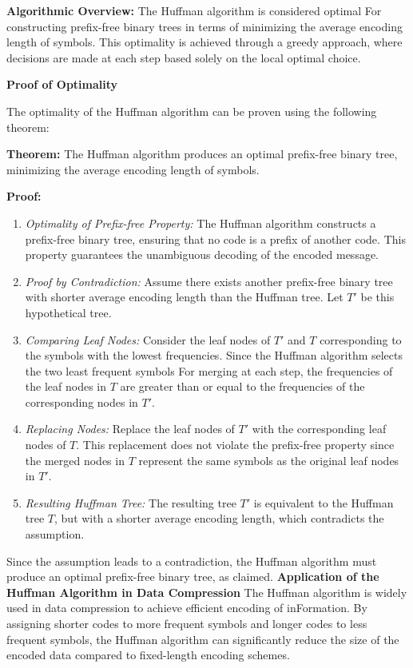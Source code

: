 \documentclass[12pt]{book} %
\begin{document}
\textbf{Algorithmic Overview:}
\FloatBarrier
The Huffman algorithm is considered optimal For constructing prefix-free binary trees in terms of minimizing the average encoding length of symbols. This optimality is achieved through a greedy approach, where decisions are made at each step based solely on the local optimal choice.

\textbf{Proof of Optimality}

The optimality of the Huffman algorithm can be proven using the following theorem:

\textbf{Theorem:} The Huffman algorithm produces an optimal prefix-free binary tree, minimizing the average encoding length of symbols.

\textbf{Proof:} 

\begin{enumerate}
    \item \textit{Optimality of Prefix-free Property:} The Huffman algorithm constructs a prefix-free binary tree, ensuring that no code is a prefix of another code. This property guarantees the unambiguous decoding of the encoded message.
    
    \item \textit{Proof by Contradiction:} Assume there exists another prefix-free binary tree with shorter average encoding length than the Huffman tree. Let $T'$ be this hypothetical tree.
    
    \item \textit{Comparing Leaf Nodes:} Consider the leaf nodes of $T'$ and $T$ corresponding to the symbols with the lowest frequencies. Since the Huffman algorithm selects the two least frequent symbols For merging at each step, the frequencies of the leaf nodes in $T$ are greater than or equal to the frequencies of the corresponding nodes in $T'$.
    
    \item \textit{Replacing Nodes:} Replace the leaf nodes of $T'$ with the corresponding leaf nodes of $T$. This replacement does not violate the prefix-free property since the merged nodes in $T$ represent the same symbols as the original leaf nodes in $T'$.
    
    \item \textit{Resulting Huffman Tree:} The resulting tree $T'$ is equivalent to the Huffman tree $T$, but with a shorter average encoding length, which contradicts the assumption.
\end{enumerate}

Since the assumption leads to a contradiction, the Huffman algorithm must produce an optimal prefix-free binary tree, as claimed.
\FloatBarrier
\textbf{Application of the Huffman Algorithm in Data Compression}
\FloatBarrier
The Huffman algorithm is widely used in data compression to achieve efficient encoding of inFormation. By assigning shorter codes to more frequent symbols and longer codes to less frequent symbols, the Huffman algorithm can significantly reduce the size of the encoded data compared to fixed-length encoding schemes.
\end{document}
